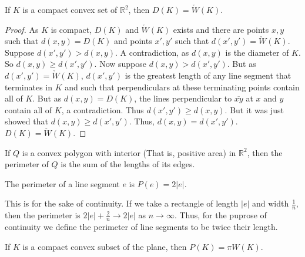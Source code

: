         \begin{theorem}
        If $K$ is a compact convex set of $\mathbb{R}^2$, then $D(K) = \check{W}(K)$.
        \end{theorem}
        \begin{proof}
        As $K$ is compact, $D(K)$ and $\check{W}(K)$ exists and there are points $x,y$ such that $d(x,y) = D(K)$ and points $x',y'$ such that $d(x',y') = \check{W}(K)$. Suppose $d(x',y')> d(x,y)$. A contradiction, as $d(x,y)$ is the diameter of $K$. So $d(x,y) \geq d(x',y')$. Now suppose $d(x,y)>d(x',y')$. But as $d(x',y')= \check{W}(K)$, $d(x',y')$ is the greatest length of any line segment that terminates in $K$ and such that perpendiculars at these terminating points contain all of $K$. But as $d(x,y)=D(K)$, the lines perpendicular to $\overline{xy}$ at $x$ and $y$ contain all of $K$, a contradiction. Thus $d(x',y') \geq d(x,y)$. But it was just showed that $d(x,y)\geq d(x',y')$. Thus, $d(x,y) = d(x',y')$. $D(K) = \check{W}(K)$.
        \end{proof}
        \begin{definition}
        If $Q$ is a convex polygon with interior (That is, positive area) in $\mathbb{R}^2$, then the perimeter of $Q$ is the sum of the lengths of its edges. 
        \end{definition}
        \begin{definition}
        The perimeter of a line segment $e$ is $P(e) = 2|e|$.
        \end{definition}
        This is for the sake of continuity. If we take a rectangle of length $|e|$ and width $\frac{1}{n}$, then the perimeter is $2|e|+\frac{2}{n} \rightarrow 2|e|$ as $n\rightarrow \infty$. Thus, for the puprose of continuity we define the perimeter of line segments to be twice their length.
        \begin{theorem}
        If $K$ is a compact convex subset of the plane, then $P(K) = \pi W(K)$.
        \end{theorem}
